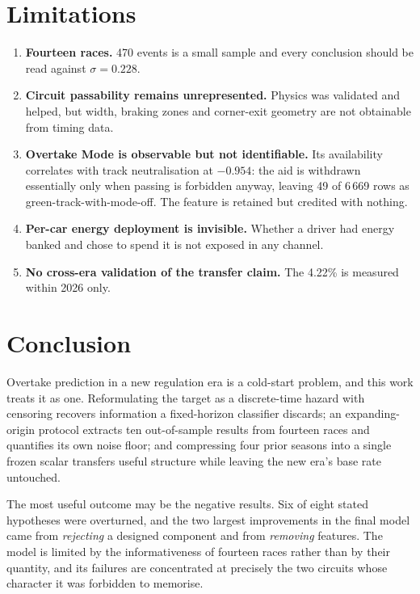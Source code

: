 \documentclass[11pt,a4paper]{article}
\begin{document}
\section{Limitations}

\begin{enumerate}[label=\arabic*.]
  \item \textbf{Fourteen races.} 470 events is a small sample and every
        conclusion should be read against $\sigma = 0.228$.
  \item \textbf{Circuit passability remains unrepresented.} Physics was
        validated and helped, but width, braking zones and corner-exit geometry
        are not obtainable from timing data.
  \item \textbf{Overtake Mode is observable but not identifiable.} Its
        availability correlates with track neutralisation at $-0.954$: the aid is
        withdrawn essentially only when passing is forbidden anyway, leaving
        49 of 6\,669 rows as green-track-with-mode-off. The feature is
        retained but credited with nothing.
  \item \textbf{Per-car energy deployment is invisible.} Whether a driver had
        energy banked and chose to spend it is not exposed in any channel.
  \item \textbf{No cross-era validation of the transfer claim.} The
        4.22\% is measured within 2026 only.
\end{enumerate}

\section{Conclusion}

Overtake prediction in a new regulation era is a cold-start problem, and this
work treats it as one. Reformulating the target as a discrete-time hazard with
censoring recovers information a fixed-horizon classifier discards; an
expanding-origin protocol extracts ten out-of-sample results from fourteen races
and quantifies its own noise floor; and compressing four prior seasons into a
single frozen scalar transfers useful structure while leaving the new era's base
rate untouched.

The most useful outcome may be the negative results. Six of eight stated
hypotheses were overturned, and the two largest improvements in the final model
came from \emph{rejecting} a designed component and from \emph{removing}
features. The model is limited by the informativeness of fourteen races rather
than by their quantity, and its failures are concentrated at precisely the two
circuits whose character it was forbidden to memorise.
\end{document}
